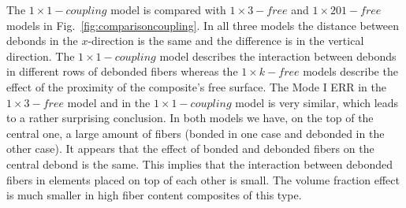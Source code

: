 \documentclass[review]{elsarticle}
\begin{document}
The $1\times 1-coupling$ model is compared with $1\times 3-free$ and $1\times 201-free$ models in Fig.~\ref{fig:comparisoncoupling}. In all three models the distance between debonds in the $x$-direction is the same and the difference is in the vertical direction. The $1\times 1-coupling$ model describes the interaction between debonds in different rows of debonded fibers whereas the $1\times k-free$ models describe the effect of the proximity of the composite's free surface. The Mode I ERR in the $1\times 3-free$ model and in the $1\times 1-coupling$ model is very similar, which leads to a rather surprising conclusion. In both models we have, on the top of the central one, a large amount of fibers (bonded in one case and debonded in the other case). It appears that the effect of bonded and debonded fibers on the central debond is the same. This implies that the interaction between debonded fibers in elements placed on top of each other is small. The volume fraction effect is much smaller in high fiber content composites of this type.
\end{document}
